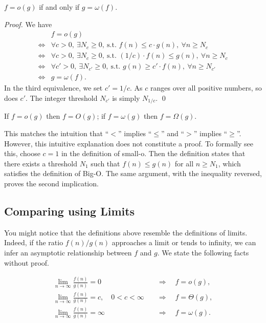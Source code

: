 \begin{claim}
$f = o(g)$ if and only if $g = \omega(f)$.
\end{claim}
\emph{Proof.} We have
\begin{displaymath}
\begin{array}{rll}
& f = o(g) \\
\Leftrightarrow & \forall c>0,\ \exists N_c\ge 0,\ \textrm{s.t.\ } f(n)\le c\cdot g(n),\ \forall n\ge N_c \\
\Leftrightarrow & \forall c>0,\ \exists N_c\ge 0,\ \textrm{s.t.\ } (1/c)\cdot f(n)\le g(n),\ \forall n\ge N_c \\
\Leftrightarrow & \forall c'>0,\ \exists N_{c'}\ge 0,\ \textrm{s.t.\ } g(n)\ge c'\cdot f(n),\ \forall n\ge N_{c'} \\
\Leftrightarrow & g = \omega(f).
\end{array}
\end{displaymath}
In the third equivalence, we set $c'=1/c$. As $c$ ranges over all positive
numbers, so does $c'$. The integer threshold 
$N_{c'}$ is simply $N_{1/c}$.  \qed


\begin{claim}
If $f = o(g)$ then $f = O(g)$; if $f = \omega(g)$ then $f = \Omega(g)$.
\end{claim}
This matches the intuition that ``$<$'' implies ``$\le$'' and ``$>$'' implies
``$\ge$''. However, this intuitive explanation does not constitute a proof.
To formally see this, choose $c=1$ in the definition of
small-o. Then the definition states that there exists a threshold $N_1$ such that $f(n)\le g(n)$ for all
$n\ge N_1$, which satisfies the definition of Big-O. The same argument,
with the inequality reversed, proves the second implication.

\subsection*{Comparing using Limits}
You might notice that the definitions above resemble the definitions of limits.
Indeed, if the ratio $f(n)/g(n)$ approaches a limit or tends to infinity,
we can infer an asymptotic relationship between $f$ and $g$.
We state the following facts without proof.
\begin{claim} \label{claim:limit}
\[
\begin{aligned}
\lim_{n\to\infty}\frac{f(n)}{g(n)}=0
    &\quad\Longrightarrow\quad f=o(g), \\
\lim_{n\to\infty}\frac{f(n)}{g(n)}=c,\quad 0<c<\infty
    &\quad\Longrightarrow\quad f=\Theta(g), \\
\lim_{n\to\infty}\frac{f(n)}{g(n)}=\infty
    &\quad\Longrightarrow\quad f=\omega(g).
\end{aligned}
\]
\end{claim}

